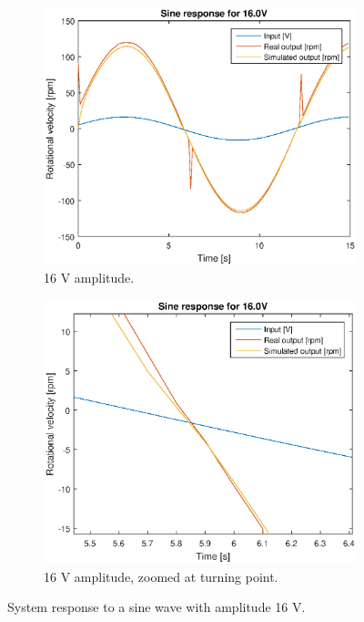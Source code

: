 \begin{figure}[H]
    \centering
    \begin{subfigure}[H]{0.48\textwidth}
    \includegraphics[width=\textwidth]{./img/testrig_16Vsine_no_i_fric.eps}
    \caption{16 V amplitude.}
    \label{fig:sin162}
    \end{subfigure}
    \begin{subfigure}[H]{0.48\textwidth}
    \includegraphics[width=\textwidth]{./img/testrig_16Vsine_no_i_fric_zoom.eps}
    \caption{16 V amplitude, zoomed at turning point.}
    \label{fig:sin162z}
    \end{subfigure}
    \caption{System response to a sine wave with amplitude 16 V.}
\end{figure}

